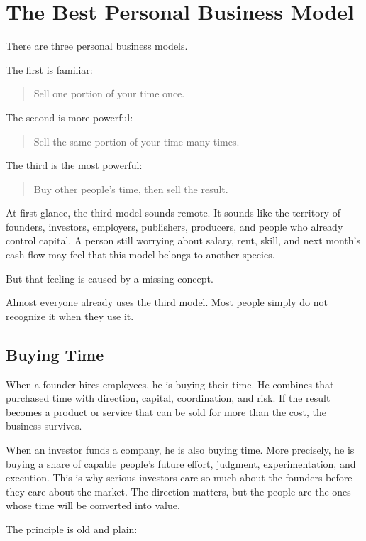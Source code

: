 \chapter{The Best Personal Business Model}

There are three personal business models.

The first is familiar:

\begin{quote}
Sell one portion of your time once.
\end{quote}

The second is more powerful:

\begin{quote}
Sell the same portion of your time many times.
\end{quote}

The third is the most powerful:

\begin{quote}
Buy other people's time, then sell the result.
\end{quote}

At first glance, the third model sounds remote. It sounds like the territory of founders, investors, employers, publishers, producers, and people who already control capital. A person still worrying about salary, rent, skill, and next month's cash flow may feel that this model belongs to another species.

But that feeling is caused by a missing concept.

Almost everyone already uses the third model. Most people simply do not recognize it when they use it.

\section*{Buying Time}

When a founder hires employees, he is buying their time. He combines that purchased time with direction, capital, coordination, and risk. If the result becomes a product or service that can be sold for more than the cost, the business survives.

When an investor funds a company, he is also buying time. More precisely, he is buying a share of capable people's future effort, judgment, experimentation, and execution. This is why serious investors care so much about the founders before they care about the market. The direction matters, but the people are the ones whose time will be converted into value.

The principle is old and plain:

